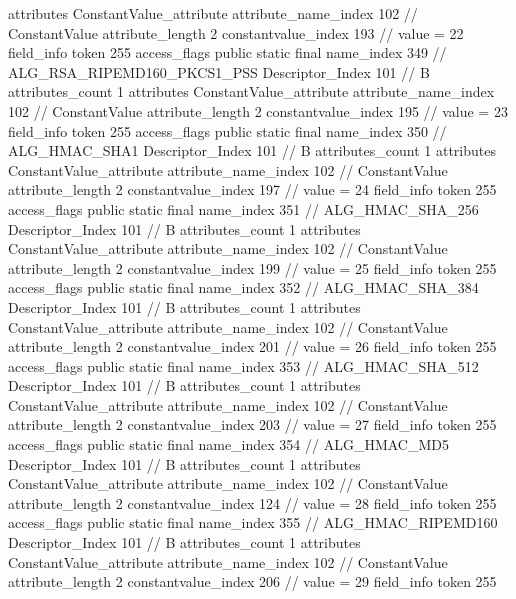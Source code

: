 {{{{{				attributes {
				ConstantValue_attribute {
					attribute_name_index	102		// ConstantValue
					attribute_length	2
					constantvalue_index	193		// value = 22
				}
				}
			}
			field_info {
				token	255
				access_flags	public static final
				name_index	349		// ALG_RSA_RIPEMD160_PKCS1_PSS
				Descriptor_Index	101		// B
				attributes_count	1
				attributes {
				ConstantValue_attribute {
					attribute_name_index	102		// ConstantValue
					attribute_length	2
					constantvalue_index	195		// value = 23
				}
				}
			}
			field_info {
				token	255
				access_flags	public static final
				name_index	350		// ALG_HMAC_SHA1
				Descriptor_Index	101		// B
				attributes_count	1
				attributes {
				ConstantValue_attribute {
					attribute_name_index	102		// ConstantValue
					attribute_length	2
					constantvalue_index	197		// value = 24
				}
				}
			}
			field_info {
				token	255
				access_flags	public static final
				name_index	351		// ALG_HMAC_SHA_256
				Descriptor_Index	101		// B
				attributes_count	1
				attributes {
				ConstantValue_attribute {
					attribute_name_index	102		// ConstantValue
					attribute_length	2
					constantvalue_index	199		// value = 25
				}
				}
			}
			field_info {
				token	255
				access_flags	public static final
				name_index	352		// ALG_HMAC_SHA_384
				Descriptor_Index	101		// B
				attributes_count	1
				attributes {
				ConstantValue_attribute {
					attribute_name_index	102		// ConstantValue
					attribute_length	2
					constantvalue_index	201		// value = 26
				}
				}
			}
			field_info {
				token	255
				access_flags	public static final
				name_index	353		// ALG_HMAC_SHA_512
				Descriptor_Index	101		// B
				attributes_count	1
				attributes {
				ConstantValue_attribute {
					attribute_name_index	102		// ConstantValue
					attribute_length	2
					constantvalue_index	203		// value = 27
				}
				}
			}
			field_info {
				token	255
				access_flags	public static final
				name_index	354		// ALG_HMAC_MD5
				Descriptor_Index	101		// B
				attributes_count	1
				attributes {
				ConstantValue_attribute {
					attribute_name_index	102		// ConstantValue
					attribute_length	2
					constantvalue_index	124		// value = 28
				}
				}
			}
			field_info {
				token	255
				access_flags	public static final
				name_index	355		// ALG_HMAC_RIPEMD160
				Descriptor_Index	101		// B
				attributes_count	1
				attributes {
				ConstantValue_attribute {
					attribute_name_index	102		// ConstantValue
					attribute_length	2
					constantvalue_index	206		// value = 29
				}
				}
			}
			field_info {
				token	255
}}}}}
